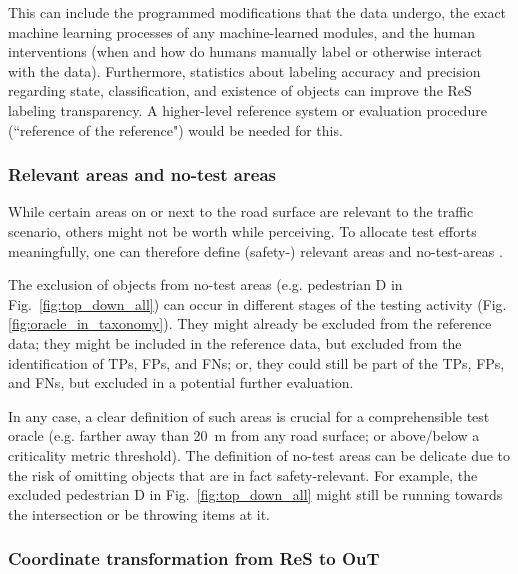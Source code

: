 \documentclass[conference]{IEEEtran}
\begin{document}
This can include
the programmed modifications that the data undergo, the exact machine learning processes of any machine-learned modules, and the human interventions (when and how do humans manually label or otherwise interact with the data).
Furthermore, statistics about labeling accuracy and precision regarding state, classification, and existence of objects can improve the ReS labeling transparency.
A higher-level reference system or evaluation procedure (``reference of the reference") would be needed for this.


\subsubsection{Relevant areas and no-test areas}
\label{sec:basic_areas}

While certain areas on or next to the road surface are relevant to the traffic scenario, others might not be worth while perceiving. 
To allocate test efforts meaningfully, one can therefore define (safety-) relevant areas and no-test-areas \cite{Philipp2022systematization, Topan2022zones, Butz2020soca, Wolf2021people, Chu2023sotif}.

The exclusion of objects from no-test areas (e.g. pedestrian D in Fig.~\ref{fig:top_down_all}) can occur in different stages of the testing activity (Fig. \ref{fig:oracle_in_taxonomy}). 
They might already be excluded from the reference data; they might be included in the reference data, but excluded from the identification of TPs, FPs, and FNs; or, they could still be part of the TPs, FPs, and FNs, but excluded in a potential further evaluation.

In any case, a clear definition of such areas is crucial for a comprehensible test oracle (e.g. farther away than \SI{20}{\meter} from any road surface; or above/below a criticality metric threshold).
The definition of no-test areas can be delicate due to the risk of omitting objects that are in fact safety-relevant. 
For example, the excluded pedestrian D in Fig.~\ref{fig:top_down_all} might still be running towards the intersection or be throwing items at it.

\subsubsection{Coordinate transformation from ReS to OuT}
\label{sec:basic_spatial_alignment}
\end{document}
